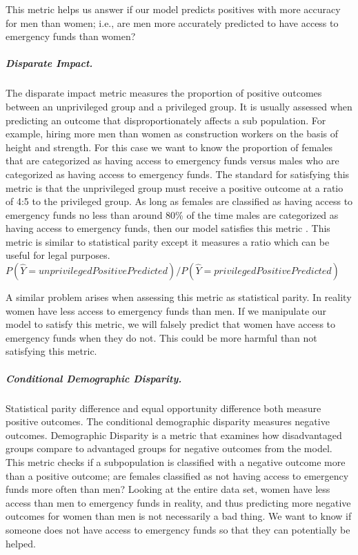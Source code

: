 \documentclass[water,article,submit,moreauthors,pdftex]{mdpi}
\begin{document}
This metric helps us answer if our model predicts positives with more
accuracy for men than women; i.e., are men more accurately predicted to
have access to emergency funds than women?

\hypertarget{disparate-impact.}{%
\subparagraph{Disparate Impact.}\label{disparate-impact.}}

The disparate impact metric measures the proportion of positive outcomes
between an unprivileged group and a privileged group. It is usually
assessed when predicting an outcome that disproportionately affects a
sub population. For example, hiring more men than women as construction
workers on the basis of height and strength. For this case we want to
know the proportion of females that are categorized as having access to
emergency funds versus males who are categorized as having access to
emergency funds. The standard for satisfying this metric is that the
unprivileged group must receive a positive outcome at a ratio of 4:5 to
the privileged group. As long as females are classified as having access
to emergency funds no less than around 80\% of the time males are
categorized as having access to emergency funds, then our model
satisfies this metric \citep{caton2020fairness}. This metric is similar
to statistical parity except it measures a ratio which can be useful for
legal purposes.
\(P(\hat{Y}=unprivilegedPositivePredicted) /P(\hat{Y}=privilegedPositivePredicted)\)

A similar problem arises when assessing this metric as statistical
parity. In reality women have less access to emergency funds than men.
If we manipulate our model to satisfy this metric, we will falsely
predict that women have access to emergency funds when they do not. This
could be more harmful than not satisfying this metric.

\hypertarget{conditional-demographic-disparity.}{%
\subparagraph{Conditional Demographic
Disparity.}\label{conditional-demographic-disparity.}}

Statistical parity difference and equal opportunity difference both
measure positive outcomes. The conditional demographic disparity
measures negative outcomes. Demographic Disparity is a metric that
examines how disadvantaged groups compare to advantaged groups for
negative outcomes from the model. This metric checks if a subpopulation
is classified with a negative outcome more than a positive outcome; are
females classified as not having access to emergency funds more often
than men? Looking at the entire data set, women have less access than
men to emergency funds in reality, and thus predicting more negative
outcomes for women than men is not necessarily a bad thing. We want to
know if someone does not have access to emergency funds so that they can
potentially be helped.
\end{document}
